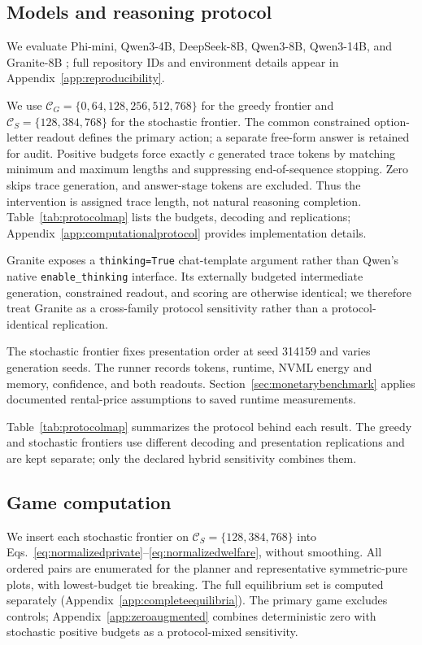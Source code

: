 \documentclass{article}
\begin{document}
\subsection{Models and reasoning protocol}

We evaluate Phi-mini, Qwen3-4B, DeepSeek-8B, Qwen3-8B, Qwen3-14B, and Granite-8B \citep{microsoft2025phireasoning,yang2025qwen3,guo2025deepseek,ibmgranite2025}; full repository IDs and environment details appear in Appendix~\ref{app:reproducibility}.

We use $\mathcal C_G=\{0,64,128,256,512,768\}$ for the greedy frontier and $\mathcal C_S=\{128,384,768\}$ for the stochastic frontier. The common constrained option-letter readout defines the primary action; a separate free-form answer is retained for audit. Positive budgets force exactly $c$ generated trace tokens by matching minimum and maximum lengths and suppressing end-of-sequence stopping. Zero skips trace generation, and answer-stage tokens are excluded. Thus the intervention is assigned trace length, not natural reasoning completion. Table~\ref{tab:protocolmap} lists the budgets, decoding and replications; Appendix~\ref{app:computationalprotocol} provides implementation details.

Granite exposes a \texttt{thinking=True} chat-template argument rather than Qwen's native \texttt{enable\_thinking} interface. Its externally budgeted intermediate generation, constrained readout, and scoring are otherwise identical; we therefore treat Granite as a cross-family protocol sensitivity rather than a protocol-identical replication.

The stochastic frontier fixes presentation order at seed 314159 and varies generation seeds. The runner records tokens, runtime, NVML energy and memory, confidence, and both readouts. Section~\ref{sec:monetarybenchmark} applies documented rental-price assumptions to saved runtime measurements.

Table~\ref{tab:protocolmap} summarizes the protocol behind each result. The greedy and stochastic frontiers use different decoding and presentation replications and are kept separate; only the declared hybrid sensitivity combines them.


\subsection{Game computation}
\label{sec:gamecomputation}

We insert each stochastic frontier on $\mathcal C_S=\{128,384,768\}$ into Eqs.~\eqref{eq:normalizedprivate}--\eqref{eq:normalizedwelfare}, without smoothing. All ordered pairs are enumerated for the planner and representative symmetric-pure plots, with lowest-budget tie breaking. The full equilibrium set is computed separately (Appendix~\ref{app:completeequilibria}). The primary game excludes controls; Appendix~\ref{app:zeroaugmented} combines deterministic zero with stochastic positive budgets as a protocol-mixed sensitivity.
\end{document}
